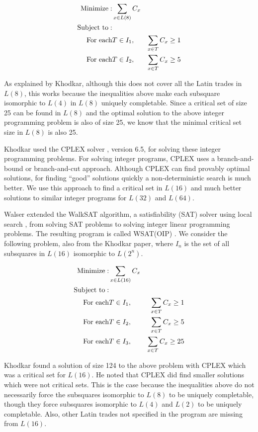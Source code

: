 \documentclass{article}
\begin{document}
\begin{eqnarray*}
{\rm Minimize}:  & \sum_{x \in L(8)}{C_{x}} & \\
{\rm Subject~to}:  \\
{\rm For~each} &T \in {I_{1}},& \sum_{x \in T}{C_{x}} \geq 1 \\
{\rm For~each} &T \in {I_{2}},& \sum_{x \in T}{C_{x}} \geq 5 \\
\end{eqnarray*}


As explained by Khodkar, although this does not cover all the
Latin trades in $L(8)$, this works because the inequalities
above make each subsquare isomorphic to $L(4)$ in $L(8)$
uniquely completable.  Since a critical set of size 25 can be found
in $L(8)$ and the optimal solution to the above integer programming
problem is also of size 25, we know that the minimal critical set
size in $L(8)$ is also 25.

Khodkar used the CPLEX solver \cite{cplex}, version 6.5, for solving these
integer programming problems.  For solving integer programs,
CPLEX uses a branch-and-bound or branch-and-cut approach.  Although
CPLEX can find provably optimal solutions, for finding ``good'' solutions
quickly a non-deterministic search is much better.  We use this approach
to find a critical set in $L(16)$ and much better solutions to
similar integer programs for $L(32)$ and $L(64)$.

Walser extended the WalkSAT algorithm, a satisfiability (SAT)
solver using local search \cite{sel}, from solving SAT problems to
solving integer linear programming problems.  The resulting
program is called WSAT(OIP) \cite{wsat}.  We consider the
following problem, also from the Khodkar paper, where $I_n$ is the
set of all subsquares in $L(16)$ isomorphic to $L(2^n)$.
\newline

\begin{eqnarray*}
{\rm Minimize}:  & \sum_{x \in L(16)}{C_{x}} & \\
{\rm Subject~to}:  \\
{\rm For~each} &T \in {I_{1}},& \sum_{x \in T}{C_{x}} \geq 1 \\
{\rm For~each} &T \in {I_{2}},& \sum_{x \in T}{C_{x}} \geq 5 \\
{\rm For~each} &T \in {I_{3}},& \sum_{x \in T}{C_{x}} \geq 25 \\
\end{eqnarray*}


Khodkar found a solution of size 124 to the above problem with
CPLEX which was a critical set for $L(16)$.  He noted \cite{ak}
that CPLEX did find smaller solutions which were not critical
sets.  This is the case because the inequalities above do not
necessarily force the subsquares isomorphic to $L(8)$ to be
uniquely completable, though they force subsquares isomorphic to
$L(4)$ and $L(2)$ to be uniquely completable.  Also, other Latin
trades not specified in the program are missing from $L(16)$.
\end{document}
